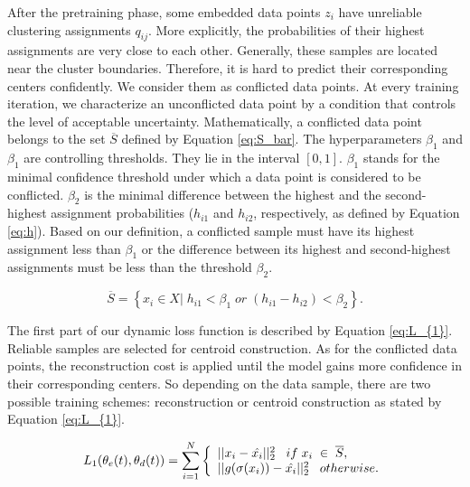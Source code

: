 \documentclass{article}
\begin{document}
After the pretraining phase, some embedded data points $z_{i}$ have unreliable clustering assignments $q_{ij}$. More explicitly, the probabilities of their highest assignments are very close to each other. Generally, these samples are located near the cluster boundaries. Therefore, it is hard to predict their corresponding centers confidently. We consider them as conflicted data points. At every training iteration, we characterize an unconflicted data point by a condition that controls the level of acceptable uncertainty. Mathematically, a conflicted data point belongs to the set $\overline{S}$ defined by Equation \ref{eq:S_bar}. The hyperparameters $\beta_{1}$ and $\beta_{1}$ are controlling thresholds. They lie in the interval $[0, 1]$. $\beta_{1}$ stands for the minimal confidence threshold under which a data point is considered to be conflicted. $\beta_{2}$ is the minimal difference between the highest and the second-highest assignment probabilities ($h_{i1}$ and $h_{i2}$, respectively, as defined by Equation \ref{eq:h}). Based on our definition, a conflicted sample must have its highest assignment less than $\beta_{1}$ or the difference between its highest and second-highest assignments must be less than the threshold $\beta_{2}$. 

\begin{equation}\label{eq:S_bar}
    \overline{S}=\left \{ x_{i} \in X | \; h_{i1} <  \beta_{1} \; or \;  (h_{i1}-h_{i2}) <  \beta_{2}  \right \}. 
\end{equation}

The first part of our dynamic loss function is described by Equation \ref{eq:L_{1}}. Reliable samples are selected for centroid construction. As for the conflicted data points, the reconstruction cost is applied until the model gains more confidence in their corresponding centers. So depending on the data sample, there are two possible training schemes: reconstruction or centroid construction as stated by Equation \ref{eq:L_{1}}.

\begin{equation} \label{eq:L_{1}}
    \begin{aligned}
    L_{1}(\theta_{e}(t), \theta_{d}(t)) = \sum_{i=1}^{N} \left\{
                \begin{array}{ll}
                  ||x_{i} - \hat{x_{i}}||_{2}^{2} \;\;\; if \; x_{i} \; \in \; \overline{S},
                  \\
                  ||g(\sigma(x_{i})) - \hat{x_{i}}||_{2}^{2} \;\;\;  otherwise.
                \end{array}
              \right. 
    \end{aligned}
\end{equation}
\end{document}
